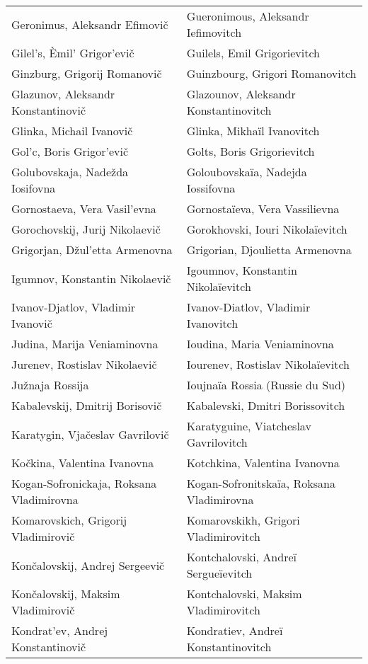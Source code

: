 {\begin{longtable}[c]{ll}
 \\
 Geronimus, Aleksandr Efimovič
 & Gueronimous, Aleksandr Iefimovitch
 \\
 Gilel's, Èmil' Grigor'evič
 & Guilels, Emil Grigorievitch
 \\
 Ginzburg, Grigorij Romanovič
 & Guinzbourg, Grigori Romanovitch
 \\
 Glazunov, Aleksandr Konstantinovič
 & Glazounov, Aleksandr Konstantinovitch
 \\
 Glinka, Michail Ivanovič
 & Glinka, Mikhaïl Ivanovitch
 \\
 Gol'c, Boris Grigor'evič
 & Golts, Boris Grigorievitch
 \\
 Golubovskaja, Nadežda Iosifovna
 & Goloubovskaïa, Nadejda Iossifovna
 \\
 Gornostaeva, Vera Vasil'evna
 & Gornostaïeva, Vera Vassilievna
 \\
 Gorochovskij, Jurij Nikolaevič
 & Gorokhovski, Iouri Nikolaïevitch
 \\
 Grigorjan, Džul'etta Armenovna
 & Grigorian, Djoulietta Armenovna
 \\
 Igumnov, Konstantin Nikolaevič
 & Igoumnov, Konstantin Nikolaïevitch
 \\
 Ivanov-Djatlov, Vladimir Ivanovič
 & Ivanov-Diatlov, Vladimir Ivanovitch
 \\
 Judina, Marija Veniaminovna
 & Ioudina, Maria Veniaminovna
 \\
 Jurenev, Rostislav Nikolaevič
 & Iourenev, Rostislav Nikolaïevitch
 \\
 Južnaja Rossija
 & Ioujnaïa Rossia (Russie du Sud)
 \\
 Kabalevskij, Dmitrij Borisovič
 & Kabalevski, Dmitri Borissovitch
 \\
 Karatygin, Vjačeslav Gavrilovič
 & Karatyguine, Viatcheslav Gavrilovitch
 \\
 Kočkina, Valentina Ivanovna
 & Kotchkina, Valentina Ivanovna
 \\
 Kogan-Sofronickaja, Roksana Vladimirovna
 & Kogan-Sofronitskaïa, Roksana Vladimirovna
 \\
 Komarovskich, Grigorij Vladimirovič
 & Komarovskikh, Grigori Vladimirovitch
 \\
 Končalovskij, Andrej Sergeevič
 & Kontchalovski, Andreï Sergueïevitch
 \\
 Končalovskij, Maksim Vladimirovič
 & Kontchalovski, Maksim Vladimirovitch
 \\
 Kondrat'ev, Andrej Konstantinovič
 & Kondratiev, Andreï Konstantinovitch
 \\

\end{longtable}}
